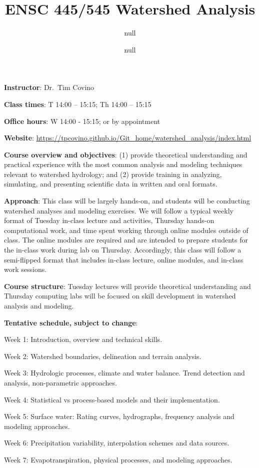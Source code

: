 \documentclass[
]{article}
\title{ENSC 445/545 Watershed Analysis}
\author{null}
\date{null}
\begin{document}
\maketitle

\textbf{Instructor}: Dr.~Tim Covino

\textbf{Class times}: T 14:00 -- 15:15; Th 14:00 -- 15:15

\textbf{Office hours}: W 14:00 - 15:15; or by appointment

\textbf{Website}:
\url{https://tpcovino.github.io/Git_home/watershed_analysis/index.html}

\textbf{Course overview and objectives}: (1) provide theoretical
understanding and practical experience with the most common analysis and
modeling techniques relevant to watershed hydrology; and (2) provide
training in analyzing, simulating, and presenting scientific data in
written and oral formats.

\textbf{Approach}: This class will be largely hands-on, and students
will be conducting watershed analyses and modeling exercises. We will
follow a typical weekly format of Tuesday in-class lecture and
activities, Thursday hands-on computational work, and time spent working
through online modules outside of class. The online modules are required
and are intended to prepare students for the in-class work during lab on
Thursday. Accordingly, this class will follow a semi-flipped format that
includes in-class lecture, online modules, and in-class work sessions.

\textbf{Course structure}: Tuesday lectures will provide theoretical
understanding and Thursday computing labs will be focused on skill
development in watershed analysis and modeling.

\textbf{Tentative schedule, subject to change}:

Week 1: Introduction, overview and technical skills.

Week 2: Watershed boundaries, delineation and terrain analysis.

Week 3: Hydrologic processes, climate and water balance. Trend detection
and analysis, non-parametric approaches.

Week 4: Statistical vs process-based models and their implementation.

Week 5: Surface water: Rating curves, hydrographs, frequency analysis
and modeling approaches.

Week 6: Precipitation variability, interpolation schemes and data
sources.

Week 7: Evapotranspiration, physical processes, and modeling approaches.
\end{document}
